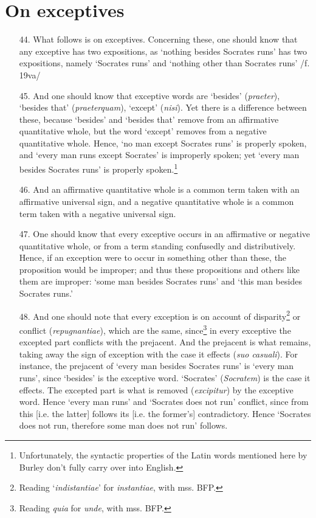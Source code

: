 \documentclass[]{article}
\begin{document}
\section{On exceptives}
\begin{itemize}
\item[44.] What follows is on exceptives. Concerning these, one should know that any exceptive has two expositions, as `nothing besides Socrates runs' has two expositions, namely `Socrates runs' and `nothing other than Socrates runs' /f. 19va/
\item[45.] And one should know that exceptive words are `besides' (\textit{praeter}), `besides that' (\textit{praeterquam}), `except' (\textit{nisi}). Yet there is a difference between these, because `besides' and `besides that' remove from an affirmative quantitative whole, but the word `except' removes from a negative quantitative whole. Hence, `no man except Socrates runs' is properly spoken, and `every man runs except Socrates' is improperly spoken; yet `every man besides Socrates runs' is properly spoken.\footnote{Unfortunately, the syntactic properties of the Latin words mentioned here by Burley don't fully carry over into English.}
\item[46.] And an affirmative quantitative whole is a common term taken with an affirmative universal sign, and a negative quantitative whole is a common term taken with a negative universal sign.
\item[47.] One should know that every exceptive occurs in an affirmative or negative quantitative whole, or from a term standing confusedly and distributively. Hence, if an exception were to occur in something other than these, the proposition would be improper; and thus these propositions and others like them are improper: `some man besides Socrates runs' and `this man besides Socrates runs.'
\item[48.] And one should note that every exception is on account of disparity\footnote{Reading `\textit{indistantiae}' for \textit{instantiae}, with mss. BFP.} or conflict (\textit{repugnantiae}), which are the same, since\footnote{Reading \textit{quia} for \textit{unde}, with mss. BFP.} in every exceptive the excepted part conflicts with the prejacent. And the prejacent is what remains, taking away the sign of exception with the case it effects (\textit{suo casuali}). For instance, the prejacent of `every man besides Socrates runs' is `every man runs', since `besides' is the exceptive word. `Socrates' (\textit{Socratem}) is the case it effects. The excepted part is what is removed (\textit{excipitur}) by the exceptive word. Hence `every man runs' and `Socrates does not run' conflict, since from this [i.e. the latter] follows its [i.e. the former's] contradictory. Hence `Socrates does not run, therefore some man does not run' follows.

\end{itemize}
\end{document}
